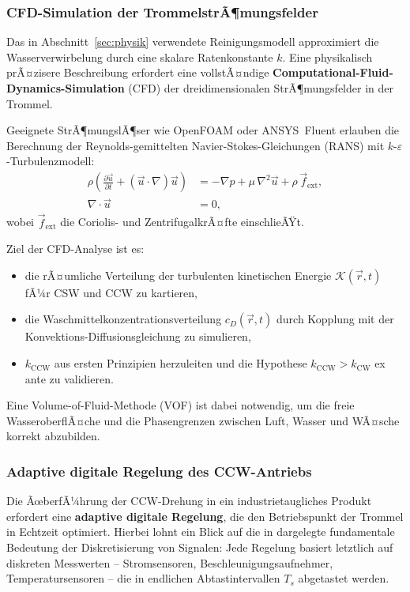﻿\documentclass[12pt,a4paper]{article}
\theoremstyle{remark}
\newcommand{\CCW}{\mathrm{CCW}}
\newcommand{\CW}{\mathrm{CW}}
\begin{document}
	\subsubsection{CFD-Simulation der TrommelstrÃ¶mungsfelder}
	
	Das in Abschnitt~\ref{sec:physik} verwendete Reinigungsmodell approximiert die
	Wasserverwirbelung durch eine skalare Ratenkonstante $k$. Eine physikalisch prÃ¤zisere
	Beschreibung erfordert eine vollstÃ¤ndige \textbf{Computational-Fluid-Dynamics-Simulation}
	(CFD) der dreidimensionalen StrÃ¶mungsfelder in der Trommel.
	
	Geeignete StrÃ¶mungslÃ¶ser wie OpenFOAM oder ANSYS~Fluent erlauben die Berechnung der
	Reynolds-gemittelten Navier-Stokes-Gleichungen (RANS) mit $k$-$\varepsilon$-Turbulenz\-modell:
	\begin{align}
		\rho\left(\frac{\partial \vec{u}}{\partial t} + (\vec{u}\cdot\nabla)\vec{u}\right)
		&= -\nabla p + \mu\,\nabla^2\vec{u} + \rho\,\vec{f}_{\mathrm{ext}},\\
		\nabla\cdot\vec{u} &= 0,
	\end{align}
	wobei $\vec{f}_{\mathrm{ext}}$ die Coriolis- und ZentrifugalkrÃ¤fte einschlieÃŸt.
	
	Ziel der CFD-Analyse ist es:
	\begin{itemize}
		\item die rÃ¤umliche Verteilung der turbulenten kinetischen Energie $\mathcal{K}(\vec{r},t)$
		fÃ¼r CSW und CCW zu kartieren,
		\item die Waschmittelkonzentrationsverteilung $c_D(\vec{r},t)$ durch Kopplung mit der
		Konvek\-tions-Diffusionsgleichung zu simulieren,
		\item $k_{\CCW}$ aus ersten Prinzipien herzuleiten und die Hypothese
		$k_{\CCW} > k_{\CW}$ ex ante zu validieren.
	\end{itemize}
	
	Eine Volume-of-Fluid-Methode (VOF) ist dabei notwendig, um die freie WasseroberflÃ¤che
	und die Phasengrenzen zwischen Luft, Wasser und WÃ¤sche korrekt abzubilden.
	
	\subsubsection{Adaptive digitale Regelung des CCW-Antriebs}
	
	Die ÃœberfÃ¼hrung der CCW-Drehung in ein industrietaugliches Produkt erfordert eine
	\textbf{adaptive digitale Regelung}, die den Betriebspunkt der Trommel in Echtzeit
	optimiert. Hierbei lohnt ein Blick auf die in \cite{epp2026digi} dargelegte
	fundamentale Bedeutung der Diskretisierung von Signalen: Jede Regelung basiert letztlich
	auf diskreten Messwerten -- Stromsensoren, Beschleunigungsaufnehmer,
	Temperatursensoren -- die in endlichen Abtastintervallen $T_s$ abgetastet werden.
	
\end{document}
